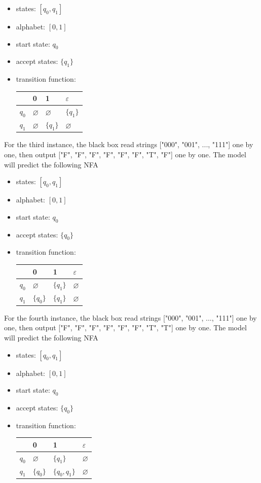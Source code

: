 \documentclass{article}
\begin{document}
\begin{itemize}
    \item states: $[q_0, q_1]$
    \item alphabet: $[0, 1]$
    \item start state: $q_0$
    \item accept states: $\{ q_1 \}$
    \item transition function: 
    \begin{tabular}{l|lll}
              & 0             & 1             & $\varepsilon$ \\ \hline
        $q_0$ & $\varnothing$ & $\varnothing$ & $\{ q_1 \}$ \\   
        $q_1$ & $\varnothing$ & $\{ q_1 \}$   & $\varnothing$ \\  
    \end{tabular}
\end{itemize}
For the third instance, the black box read strings ["000", "001", ..., "111"] one by one, then output ["F", "F", "F", "F", "F", "F", "T", "F"] one by one. The model will predict the following NFA
\begin{itemize}
    \item states: $[q_0, q_1]$
    \item alphabet: $[0, 1]$
    \item start state: $q_0$
    \item accept states: $\{ q_0 \}$
    \item transition function: 
    \begin{tabular}{l|lll}
              & 0             & 1             & $\varepsilon$ \\ \hline
        $q_0$ & $\varnothing$ & $\{ q_1 \}$   & $\varnothing$ \\   
        $q_1$ & $\{ q_0 \}$   & $\{ q_1 \}$   & $\varnothing$ \\  
    \end{tabular}
\end{itemize}
For the fourth instance, the black box read strings ["000", "001", ..., "111"] one by one, then output ["F", "F", "F", "F", "F", "F", "T", "T"] one by one. The model will predict the following NFA
\begin{itemize}
    \item states: $[q_0, q_1]$
    \item alphabet: $[0, 1]$
    \item start state: $q_0$
    \item accept states: $\{ q_0 \}$
    \item transition function: 
    \begin{tabular}{l|lll}
              & 0             & 1             & $\varepsilon$ \\ \hline
        $q_0$ & $\varnothing$ & $\{ q_1 \}$   & $\varnothing$ \\   
        $q_1$ & $\{ q_0 \}$   & $\{ q_0, q_1 \}$   & $\varnothing$ \\  
    \end{tabular}
\end{itemize}
\end{document}
